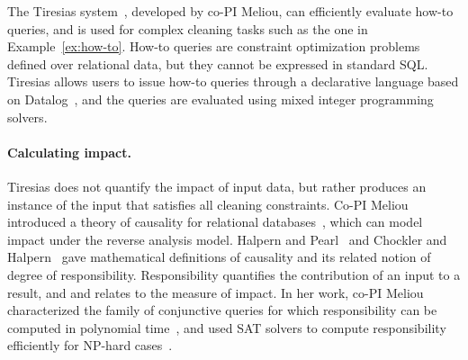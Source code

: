 
The Tiresias system~\cite{DBLP:conf/sigmod/MeliouS12, DBLP:conf/sigmod/MeliouSS12}, developed by co-PI Meliou, can efficiently evaluate how-to queries, and is used for complex cleaning tasks such as the one in Example~\ref{ex:how-to}. How-to queries are constraint optimization problems defined over relational data, but they cannot be expressed in standard SQL. Tiresias allows users to issue how-to queries through a declarative language based on Datalog~\cite{DBLP:journals/tkde/CeriGT89}, and the queries are evaluated using mixed integer programming solvers. 

\paragraph{Calculating impact.} %
\label{par:calculating_impact}
Tiresias does not quantify the impact of input data, but rather produces an instance of the input that satisfies all cleaning constraints. Co-PI Meliou introduced a theory of causality for relational databases~\cite{DBLP:journals/debu/MeliouGHKMS10}, which can model impact under the reverse analysis model. Halpern and Pearl~\cite{HalpernPearl:Cause2005} and Chockler and Halpern~\cite{DBLP:journals/jair/ChocklerH04} gave mathematical definitions of causality and its related notion of degree of responsibility. Responsibility quantifies the contribution of an input to a result, and and relates to the measure of impact. In her work, co-PI Meliou characterized the family of conjunctive queries for which responsibility can be computed in polynomial time~\cite{DBLP:journals/pvldb/MeliouGMS11}, and used SAT solvers to compute responsibility efficiently for NP-hard cases~\cite{DBLP:conf/sigmod/MeliouGNS11}.




